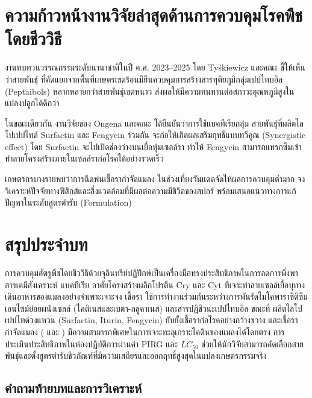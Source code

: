 \section{ความก้าวหน้างานวิจัยล่าสุดด้านการควบคุมโรคพืชโดยชีววิธี}

งานทบทวนวรรณกรรมระดับนานาชาติในปี ค.ศ. 2023–2025 โดย Tyśkiewicz และคณะ \cite{pmid36771517} ชี้ให้เห็นว่าสายพันธุ์  ที่คัดแยกจากพื้นที่เกษตรเขตร้อนมียีนควบคุมการสร้างสารทุติยภูมิกลุ่มเปปไทบอิล (Peptaibols) หลากหลายกว่าสายพันธุ์เขตหนาว ส่งผลให้มีความทนทานต่อสภาวะอุณหภูมิสูงในแปลงปลูกได้ดีกว่า

ในขณะเดียวกัน งานวิจัยของ Ongena และคณะ \cite{pmid37837627} ได้ยืนยันว่าการใช้แบคทีเรียกลุ่ม  สายพันธุ์ที่ผลิตไลโปเปปไทด์ Surfactin และ Fengycin ร่วมกัน จะก่อให้เกิดผลเสริมฤทธิ์แบบทวีคูณ (Synergistic effect) โดย Surfactin จะไปเปิดช่องว่างบนเยื่อหุ้มเซลล์รา ทำให้ Fengycin สามารถแทรกซึมเข้าทำลายโครงสร้างภายในเซลล์ราก่อโรคได้อย่างรวดเร็ว

\begin{insight}
เกษตรกรบางรายพบว่าการฉีดพ่นเชื้อรากำจัดแมลง  ในช่วงเที่ยงวันแดดจัดให้ผลการควบคุมต่ำมาก จงวิเคราะห์ปัจจัยทางฟิสิกส์และสิ่งแวดล้อมที่มีผลต่อความมีชีวิตของสปอร์ พร้อมเสนอแนวทางการแก้ปัญหาในระดับสูตรตำรับ (Formulation)
\end{insight}

\section*{สรุปประจำบท}

การควบคุมศัตรูพืชโดยชีววิธีด้วยจุลินทรีย์ปฏิปักษ์เป็นเครื่องมือทรงประสิทธิภาพในการลดการพึ่งพาสารเคมีสังเคราะห์ แบคทีเรีย  อาศัยโครงสร้างผลึกโปรตีน Cry และ Cyt ที่เจาะทำลายเซลล์เยื่อบุทางเดินอาหารของแมลงอย่างจำเพาะเจาะจง เชื้อรา  ใช้การทำงานร่วมกันระหว่างการพันรัดไมโคพาราซิติซึม เอนไซม์ย่อยผนังเซลล์ (ไคติเนสและเบตา-กลูคาเนส) และสารปฏิชีวนะเปปไทบอิล ขณะที่  ผลิตไลโปเปปไทด์วงแหวน (Surfactin, Iturin, Fengycin) ยับยั้งเชื้อราก่อโรคอย่างกว้างขวาง และเชื้อรากำจัดแมลง ( และ ) มีความสามารถพิเศษในการเจาะทะลุเกราะไคตินของแมลงได้โดยตรง การประเมินประสิทธิภาพในห้องปฏิบัติการผ่านค่า PIRG และ $LC_{50}$ ช่วยให้นักวิจัยสามารถคัดเลือกสายพันธุ์และตั้งสูตรตำรับชีวภัณฑ์ที่มีความเสถียรและออกฤทธิ์สูงสุดในแปลงเกษตรกรรมจริง

\subsection*{คำถามท้ายบทและการวิเคราะห์}

